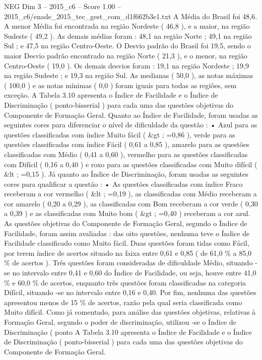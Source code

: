 \begin{textsample}{NEG Dim 3 – 2015\_c6 – Score 1.00 – 2015\_c6/enade\_2015\_tec\_gest\_com\_d1f662b3e1.txt}
A Média do Brasil foi 48,6.
A menor Média foi encontrada na região Nordeste ( 46,8 ), e a maior, na região Sudeste ( 49,2 ).
As demais médias foram : 48,1 na região Norte ; 49,1 na região Sul ; e 47,5 na região Centro-Oeste.
O Desvio padrão do Brasil foi 19,5, sendo o maior Desvio padrão encontrado na região Norte ( 21,3 ), e o menor, na região Centro-Oeste ( 19,0 ).
Os demais desvios foram : 19,1 na região Nordeste ; 19,9 na região Sudeste ; e 19,3 na região Sul.
As medianas ( 50,0 ), as notas máximas ( 100,0 ) e as notas mínimas ( 0,0 ) foram iguais para todas as regiões, sem exceção.
A Tabela 3.10 apresenta o Índice de Facilidade e o Índice de Discriminação ( ponto-bisserial ) para cada uma das questões objetivas do Componente de Formação Geral.
Quanto ao Índice de Facilidade, foram usadas as seguintes cores para diferenciar o nível de dificuldade da questão : • Azul para as questões classificadas com índice Muito fácil ( \&gt ; =0,86 ), verde para as questões classificadas com índice Fácil ( 0,61 a 0,85 ), amarelo para as questões classificadas com Médio ( 0,41 a 0,60 ), vermelho para as questões classificadas com Difícil ( 0,16 a 0,40 ) e roxo para as questões classificadas com Muito difícil ( \&lt ; =0,15 ).
Já quanto ao Índice de Discriminação, foram usadas as seguintes cores para qualificar a questão : • As questões classificadas com índice Fraco receberam a cor vermelho ( \&lt ; =0,19 ), as classificadas com Médio receberam a cor amarelo ( 0,20 a 0,29 ), as classificadas com Bom receberam a cor verde ( 0,30 a 0,39 ) e as classificadas com Muito bom ( \&gt ; =0,40 ) receberam a cor azul.
As questões objetivas do Componente de Formação Geral, segundo o Índice de Facilidade, foram assim avaliadas : das oito questões, nenhuma teve o Índice de Facilidade classificado como Muito fácil.
Duas questões foram tidas como Fácil, por terem índice de acertos situado na faixa entre 0,61 e 0,85 ( de 61,0 \% a 85,0 \% de acertos ).
Três questões foram consideradas de dificuldade Médio, situando -se no intervalo entre 0,41 e 0,60 do Índice de Facilidade, ou seja, houve entre 41,0 \% e 60,0 \% de acertos, enquanto três questões foram classificadas na categoria Difícil, situando -se no intervalo entre 0,16 e 0,40.
Por fim, nenhuma das questões apresentou menos de 15 \% de acertos, razão pela qual seria classificada como Muito difícil.
Como já comentado, para análise das questões objetivas, relativas à Formação Geral, segundo o poder de discriminação, utilizou -se o Índice de Discriminação ( ponto A Tabela 3.10 apresenta o Índice de Facilidade e o Índice de Discriminação ( ponto-bisserial ) para cada uma das questões objetivas do Componente de Formação Geral.

\end{textsample}
